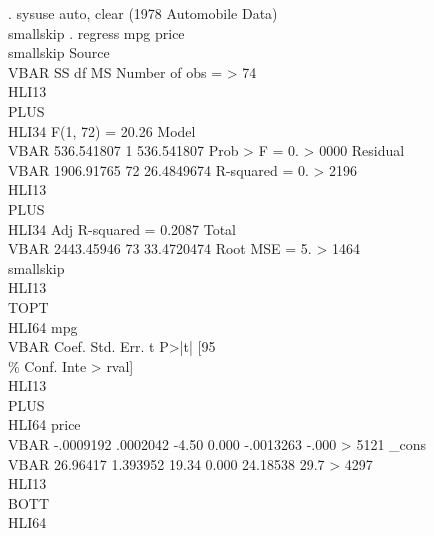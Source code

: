 . sysuse auto, clear
(1978 Automobile Data)
{\lbr}\\smallskip{\rbr}
. regress mpg price
{\lbr}\\smallskip{\rbr}
      Source {\lbr}\\VBAR{\rbr}       SS           df       MS      Number of obs   =      
>   74
\\HLI{\lbr}13{\rbr}{\lbr}\\PLUS{\rbr}\\HLI{\lbr}34{\rbr}   F(1, 72)        =     20.26
       Model {\lbr}\\VBAR{\rbr}  536.541807         1  536.541807   Prob > F        =    0.
> 0000
    Residual {\lbr}\\VBAR{\rbr}  1906.91765        72  26.4849674   R-squared       =    0.
> 2196
\\HLI{\lbr}13{\rbr}{\lbr}\\PLUS{\rbr}\\HLI{\lbr}34{\rbr}   Adj R-squared   =    0.2087
       Total {\lbr}\\VBAR{\rbr}  2443.45946        73  33.4720474   Root MSE        =    5.
> 1464
{\lbr}\\smallskip{\rbr}
\\HLI{\lbr}13{\rbr}{\lbr}\\TOPT{\rbr}\\HLI{\lbr}64{\rbr}
         mpg {\lbr}\\VBAR{\rbr}      Coef.   Std. Err.      t    P>|t|     [95\\\% Conf. Inte
> rval]
\\HLI{\lbr}13{\rbr}{\lbr}\\PLUS{\rbr}\\HLI{\lbr}64{\rbr}
       price {\lbr}\\VBAR{\rbr}  -.0009192   .0002042    -4.50   0.000    -.0013263   -.000
> 5121
       _cons {\lbr}\\VBAR{\rbr}   26.96417   1.393952    19.34   0.000     24.18538    29.7
> 4297
\\HLI{\lbr}13{\rbr}{\lbr}\\BOTT{\rbr}\\HLI{\lbr}64{\rbr}
